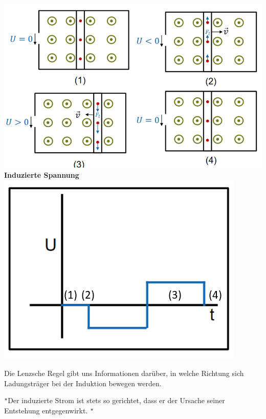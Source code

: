 \begin{center}
	\includegraphics[scale=0.4]{img/beweg-ind} \\
	\textbf{Induzierte Spannung} \\
	\includegraphics[scale=0.4]{img/beweg-ind-graph}
\end{center}



Die Lenzsche Regel gibt uns Informationen darüber, in welche Richtung sich Ladungsträger bei der Induktion bewegen werden.
\beginip
\begin{center}
	\texttt{"}Der induzierte Strom ist stets so gerichtet, dass er der Ursache seiner Entstehung entgegenwirkt.  \texttt{"}
\end{center}
\iend
\newpage

